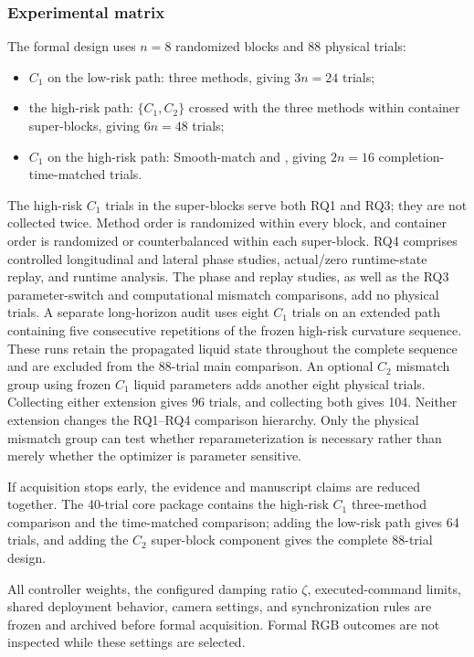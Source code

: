 \subsubsection{Experimental matrix}

The formal design uses $n=8$ randomized blocks and 88 physical trials:
\begin{itemize}
  \item $C_1$ on the low-risk path: three methods, giving $3n=24$ trials;
  \item the high-risk path: $\{C_1,C_2\}$ crossed with the three methods within
  container super-blocks, giving $6n=48$ trials;
  \item $C_1$ on the high-risk path: Smooth-match and \SMPCC{}, giving
  $2n=16$ completion-time-matched trials.
\end{itemize}
The high-risk $C_1$ trials in the super-blocks serve both RQ1 and RQ3; they are
not collected twice. Method order is randomized within every block, and
container order is randomized or counterbalanced within each super-block.
RQ4 comprises controlled longitudinal and lateral phase studies, actual/zero
runtime-state replay, and runtime analysis. The phase and replay studies, as
well as the RQ3 parameter-switch and computational mismatch comparisons, add no
physical trials. A separate long-horizon audit uses eight $C_1$ trials on an
extended path containing five consecutive repetitions of the frozen high-risk
curvature sequence. These runs retain the propagated liquid state throughout
the complete sequence and are excluded from the 88-trial main comparison. An
optional $C_2$ mismatch group using frozen $C_1$ liquid parameters adds another
eight physical trials. Collecting either extension gives 96 trials, and
collecting both gives 104. Neither extension changes the RQ1--RQ4 comparison
hierarchy. Only the physical mismatch group can test whether reparameterization
is necessary rather than merely whether the optimizer is parameter sensitive.

If acquisition stops early, the evidence and manuscript claims are reduced
together. The 40-trial core package contains the high-risk $C_1$ three-method
comparison and the time-matched comparison; adding the low-risk path gives 64
trials, and adding the $C_2$ super-block component gives the complete 88-trial
design.

All controller weights, the configured damping ratio $\zeta$,
executed-command limits, shared deployment behavior, camera settings, and
synchronization rules are frozen and archived before formal acquisition.
Formal RGB outcomes are not inspected while these settings are selected.

